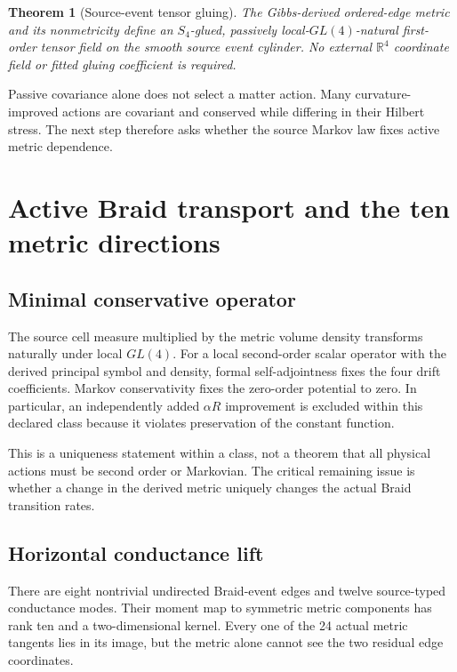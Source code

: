 \documentclass[11pt]{article}
\newtheorem{theorem}{Theorem}[section]
\theoremstyle{definition}
\theoremstyle{remark}
\begin{document}
\begin{theorem}[Source-event tensor gluing]\label{thm:tensorglue}
The Gibbs-derived ordered-edge metric and its nonmetricity define an $S_4$-glued, passively local-$GL(4)$-natural first-order tensor field on the smooth source event cylinder. No external $\mathbb R^4$ coordinate field or fitted gluing coefficient is required.
\end{theorem}

Passive covariance alone does not select a matter action. Many curvature-improved actions are covariant and conserved while differing in their Hilbert stress. The next step therefore asks whether the source Markov law fixes active metric dependence.

\section{Active Braid transport and the ten metric directions}

\subsection{Minimal conservative operator}

The source cell measure multiplied by the metric volume density transforms naturally under local $GL(4)$. For a local second-order scalar operator with the derived principal symbol and density, formal self-adjointness fixes the four drift coefficients. Markov conservativity fixes the zero-order potential to zero. In particular, an independently added $\alpha R$ improvement is excluded within this declared class because it violates preservation of the constant function.

This is a uniqueness statement within a class, not a theorem that all physical actions must be second order or Markovian. The critical remaining issue is whether a change in the derived metric uniquely changes the actual Braid transition rates.

\subsection{Horizontal conductance lift}

There are eight nontrivial undirected Braid-event edges and twelve source-typed conductance modes. Their moment map to symmetric metric components has rank ten and a two-dimensional kernel. Every one of the 24 actual metric tangents lies in its image, but the metric alone cannot see the two residual edge coordinates.
\end{document}
